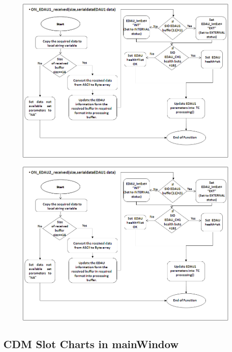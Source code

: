 \begin{figure}[H]
	\centering
	\includegraphics[width=\linewidth]{./FlowCharts/PngFlowCharts/SLOT_EDAU1.png}
\end{figure}
\begin{figure}[H]
	\centering
	\includegraphics[width=\linewidth]{./FlowCharts/PngFlowCharts/SLOT_EDAU2.png}
\end{figure}

\subsection{CDM Slot Charts in mainWindow}

